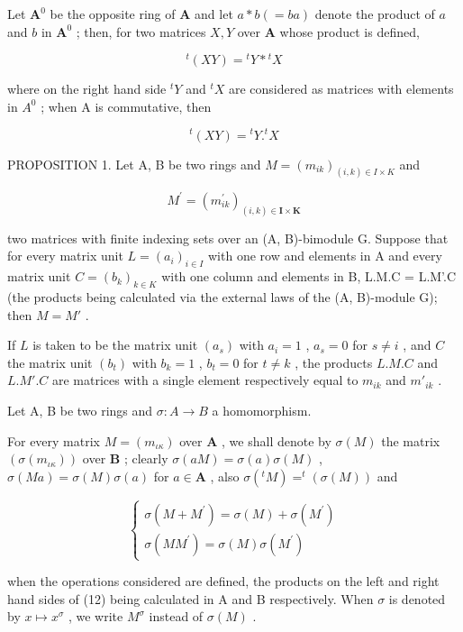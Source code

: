Let \(\mathbf{A}^0\) be the opposite ring of \(\mathbf{A}\) and let \(a * b (= ba)\) denote the product of \(a\) and \(b\) in \(\mathbf{A}^0\) ; then, for two matrices \(X, Y\) over \(\mathbf{A}\) whose product is defined,

\[
{ } ^ { t } ( X Y ) = { } ^ { t } Y * { } ^ { t } X\tag{10}
\]

where on the right hand side \(^{t}Y\) and \(^{t}X\) are considered as matrices with elements in \(A^{0}\) ; when A is commutative, then

\[
{ } ^ { t } ( X Y ) = { } ^ { t } Y . { } ^ { t } X\tag{11}
\]

PROPOSITION 1. Let A, B be two rings and \(M = (m_{ik})_{(i,k) \in I \times K}\) and

\[
M ^ {\prime} = \left(m _ {i k} ^ {\prime}\right) _ {(i, k) \in \mathbf {I} \times \mathbf {K}}
\]

two matrices with finite indexing sets over an (A, B)-bimodule G. Suppose that for every matrix unit \(L = (a_{i})_{i \in I}\) with one row and elements in A and every matrix unit \(C = (b_{k})_{k \in K}\) with one column and elements in B, L.M.C = L.M'.C (the products being calculated via the external laws of the (A, B)-module G); then \(M = M'\) .

If \(L\) is taken to be the matrix unit \((a_s)\) with \(a_i = 1\) , \(a_s = 0\) for \(s \neq i\) , and \(C\) the matrix unit \((b_t)\) with \(b_k = 1\) , \(b_t = 0\) for \(t \neq k\) , the products \(L.M.C\) and \(L.M'.C\) are matrices with a single element respectively equal to \(m_{ik}\) and \(m'_{ik}\) .

Let A, B be two rings and \(\sigma: A \to B\) a homomorphism.

For every matrix \(M = (m_{\iota\kappa})\) over \(\mathbf{A}\) , we shall denote by \(\sigma(M)\) the matrix \((\sigma(m_{\iota\kappa}))\) over \(\mathbf{B}\) ; clearly \(\sigma(aM) = \sigma(a)\sigma(M)\) , \(\sigma(Ma) = \sigma(M)\sigma(a)\) for \(a \in \mathbf{A}\) , also \(\sigma(^t M) = ^t(\sigma(M))\) and

\[
\left\{ \begin{array}{c} \sigma (M + M ^ {\prime}) = \sigma (M) + \sigma (M ^ {\prime}) \\ \sigma (M M ^ {\prime}) = \sigma (M) \sigma (M ^ {\prime}) \end{array} \right.\tag{12}
\]

when the operations considered are defined, the products on the left and right hand sides of (12) being calculated in A and B respectively. When \(\sigma\) is denoted by \(x \mapsto x^{\sigma}\) , we write \(M^{\sigma}\) instead of \(\sigma(M)\) .

